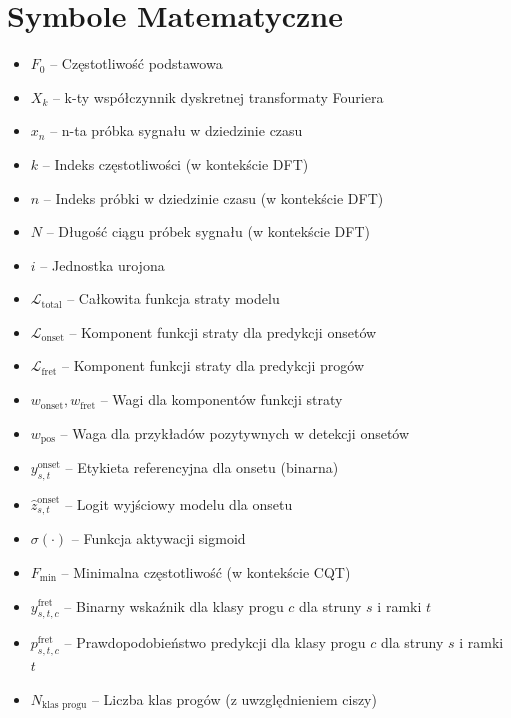 \section*{Symbole Matematyczne}
\begin{itemize}
    \item $F_0$ – Częstotliwość podstawowa
    \item $X_k$ – k-ty współczynnik dyskretnej transformaty Fouriera
    \item $x_n$ – n-ta próbka sygnału w dziedzinie czasu
    \item $k$ – Indeks częstotliwości (w kontekście DFT)
    \item $n$ – Indeks próbki w dziedzinie czasu (w kontekście DFT)
    \item $N$ – Długość ciągu próbek sygnału (w kontekście DFT)
    \item $i$ – Jednostka urojona
    \item $\mathcal{L}_{\text{total}}$ – Całkowita funkcja straty modelu
    \item $\mathcal{L}_{\text{onset}}$ – Komponent funkcji straty dla predykcji onsetów
    \item $\mathcal{L}_{\text{fret}}$ – Komponent funkcji straty dla predykcji progów
    \item $w_{\text{onset}}, w_{\text{fret}}$ – Wagi dla komponentów funkcji straty
    \item $w_{\text{pos}}$ – Waga dla przykładów pozytywnych w detekcji onsetów
    \item $y_{s,t}^{\text{onset}}$ – Etykieta referencyjna dla onsetu (binarna)
    \item $\hat{z}_{s,t}^{\text{onset}}$ – Logit wyjściowy modelu dla onsetu
    \item $\sigma(\cdot)$ – Funkcja aktywacji sigmoid
    \item $F_{\text{min}}$ – Minimalna częstotliwość (w kontekście CQT)
    \item $y_{s,t,c}^{\text{fret}}$ – Binarny wskaźnik dla klasy progu $c$ dla struny $s$ i ramki $t$
    \item $p_{s,t,c}^{\text{fret}}$ – Prawdopodobieństwo predykcji dla klasy progu $c$ dla struny $s$ i ramki $t$
    \item $N_{\text{klas progu}}$ – Liczba klas progów (z uwzględnieniem ciszy)
\end{itemize}